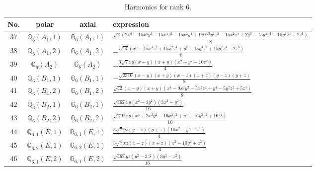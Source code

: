 \documentclass[fleqn,8pt,landscape]{jsarticle}
\begin{document}
\begin{table}[ht!]
\begin{center}
\caption{Harmonics for rank 6.}
\renewcommand{\arraystretch}{1.3}
\begin{tabular}{cccl} \hline \hline
No. & polar & axial & expression \\ \hline
$ 37 $ & $ \mathbb{Q}_{6}(A_{1},1) $ & $ \mathbb{G}_{6}(A_{1},1) $ & $ \frac{\sqrt{2} \left(2 x^{6} - 15 x^{4} y^{2} - 15 x^{4} z^{2} - 15 x^{2} y^{4} + 180 x^{2} y^{2} z^{2} - 15 x^{2} z^{4} + 2 y^{6} - 15 y^{4} z^{2} - 15 y^{2} z^{4} + 2 z^{6}\right)}{8} $ \\
$ 38 $ & $ \mathbb{Q}_{6}(A_{1},2) $ & $ \mathbb{G}_{6}(A_{1},2) $ & $ - \frac{\sqrt{14} \left(x^{6} - 15 x^{4} z^{2} + 15 x^{2} z^{4} + y^{6} - 15 y^{4} z^{2} + 15 y^{2} z^{4} - 2 z^{6}\right)}{8} $ \\
$ 39 $ & $ \mathbb{Q}_{6}(A_{2}) $ & $ \mathbb{G}_{6}(A_{2}) $ & $ - \frac{3 \sqrt{7} x y \left(x - y\right) \left(x + y\right) \left(x^{2} + y^{2} - 10 z^{2}\right)}{4} $ \\
$ 40 $ & $ \mathbb{Q}_{6}(B_{1},1) $ & $ \mathbb{G}_{6}(B_{1},1) $ & $ - \frac{\sqrt{2310} \left(x - y\right) \left(x + y\right) \left(x - z\right) \left(x + z\right) \left(y - z\right) \left(y + z\right)}{8} $ \\
$ 41 $ & $ \mathbb{Q}_{6}(B_{1},2) $ & $ \mathbb{G}_{6}(B_{1},2) $ & $ \frac{\sqrt{42} \left(x - y\right) \left(x + y\right) \left(x^{4} - 9 x^{2} y^{2} - 5 x^{2} z^{2} + y^{4} - 5 y^{2} z^{2} + 5 z^{4}\right)}{8} $ \\
$ 42 $ & $ \mathbb{Q}_{6}(B_{2},1) $ & $ \mathbb{G}_{6}(B_{2},1) $ & $ \frac{\sqrt{462} x y \left(x^{2} - 3 y^{2}\right) \left(3 x^{2} - y^{2}\right)}{16} $ \\
$ 43 $ & $ \mathbb{Q}_{6}(B_{2},2) $ & $ \mathbb{G}_{6}(B_{2},2) $ & $ \frac{\sqrt{210} x y \left(x^{4} + 2 x^{2} y^{2} - 16 x^{2} z^{2} + y^{4} - 16 y^{2} z^{2} + 16 z^{4}\right)}{16} $ \\
$ 44 $ & $ \mathbb{Q}_{6,1}(E,1) $ & $ \mathbb{G}_{6,1}(E,1) $ & $ \frac{3 \sqrt{7} y z \left(y - z\right) \left(y + z\right) \left(10 x^{2} - y^{2} - z^{2}\right)}{4} $ \\
$ 45 $ & $ \mathbb{Q}_{6,2}(E,1) $ & $ \mathbb{G}_{6,2}(E,1) $ & $ \frac{3 \sqrt{7} x z \left(x - z\right) \left(x + z\right) \left(x^{2} - 10 y^{2} + z^{2}\right)}{4} $ \\
$ 46 $ & $ \mathbb{Q}_{6,1}(E,2) $ & $ \mathbb{G}_{6,1}(E,2) $ & $ \frac{\sqrt{462} y z \left(y^{2} - 3 z^{2}\right) \left(3 y^{2} - z^{2}\right)}{16} $ \\

\end{tabular}
\end{center}
\end{table}
\end{document}
